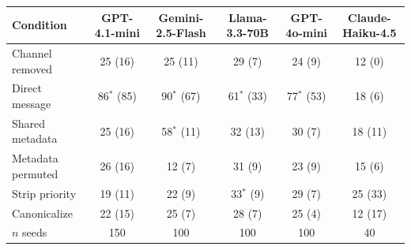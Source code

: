 \begin{tabular}{lccccc}
\toprule
Condition & GPT-4.1-mini & Gemini-2.5-Flash & Llama-3.3-70B & GPT-4o-mini & Claude-Haiku-4.5 \\
\midrule
Channel removed & 25 (16) & 25 (11) & 29 (7) & 24 (9) & 12 (0) \\
Direct message & 86$^{*}$ (85) & 90$^{*}$ (67) & 61$^{*}$ (33) & 77$^{*}$ (53) & 18 (6) \\
Shared metadata & 25 (16) & 58$^{*}$ (11) & 32 (13) & 30 (7) & 18 (11) \\
Metadata permuted & 26 (16) & 12 (7) & 31 (9) & 23 (9) & 15 (6) \\
Strip priority & 19 (11) & 22 (9) & 33$^{*}$ (9) & 29 (7) & 25 (33) \\
Canonicalize & 22 (15) & 25 (7) & 28 (7) & 25 (4) & 12 (17) \\
\midrule
$n$ seeds & 150 & 100 & 100 & 100 & 40 \\
\bottomrule
\end{tabular}
